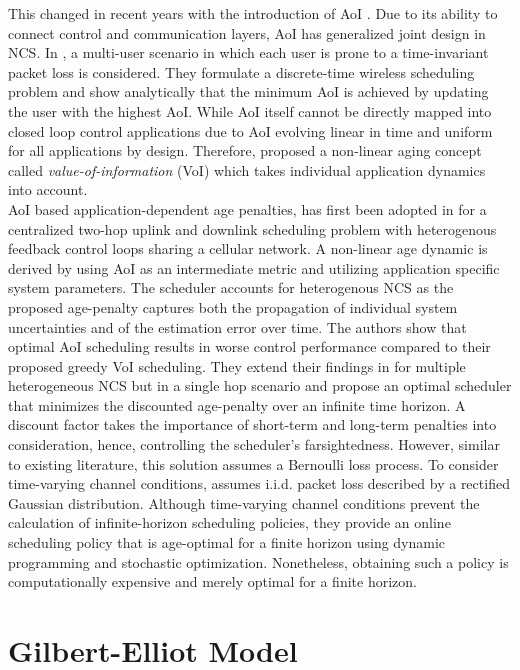This changed in recent years with the introduction of AoI \cite{kaul2012real}.
Due to its ability to connect control and communication layers, AoI has
generalized joint design in NCS. In \cite{kadota2018scheduling}, a multi-user
scenario in which each user is prone to a time-invariant packet loss is
considered. They formulate a discrete-time wireless scheduling problem and show
analytically that the minimum AoI is achieved by updating the user with the
highest AoI. While AoI itself cannot be directly mapped into closed loop control
applications due to AoI evolving linear in time and uniform for all applications
by design. Therefore, \cite{kosta2017age} proposed a non-linear aging concept
called \textit{value-of-information} (VoI) which takes individual application
dynamics into account. \\
AoI based application-dependent age penalties, has first been adopted in
\cite{ayan2019age} for a centralized two-hop uplink and downlink scheduling
problem with heterogenous feedback control loops sharing a cellular network. A
non-linear age dynamic is derived by using AoI as an intermediate metric and
utilizing application specific system parameters. The scheduler accounts for
heterogenous NCS as the proposed age-penalty captures both the propagation of
individual system uncertainties and of the estimation error over time. The
authors show that optimal AoI scheduling results in worse control performance
compared to their proposed greedy VoI scheduling. They extend their findings in
\cite{ayan2020optimal} for multiple heterogeneous NCS but in a single hop
scenario and propose an optimal scheduler that minimizes the discounted
age-penalty over an infinite time horizon. A discount factor takes the
importance of short-term and long-term penalties into consideration, hence,
controlling the scheduler's farsightedness. However, similar to existing
literature, this solution assumes a Bernoulli loss process. To consider
time-varying channel conditions, \cite{ayan2020aoi} assumes i.i.d. packet loss
described by a rectified Gaussian distribution. Although time-varying channel
conditions prevent the calculation of infinite-horizon scheduling policies, they
provide an online scheduling policy that is age-optimal for a finite horizon
using dynamic programming and stochastic optimization. Nonetheless, obtaining
such a policy is computationally expensive and merely optimal for a finite
horizon.

\section{Gilbert-Elliot Model} \label{sec:GE}

